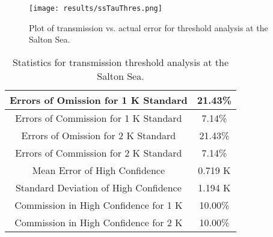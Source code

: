 \documentclass{book}
\begin{document}
\begin{minipage}[c]{0.47\textwidth}
\centering
\begin{figure}[H]
\texttt{[image: results/ssTauThres.png]}
\caption{Plot of transmission vs. actual error for threshold analysis at the Salton Sea.}
\label{fig:ssTauThres}
\end{figure}
\end{minipage}
\hspace{0.0cm}
\begin{minipage}[c]{0.47\textwidth}
\begin{table}[H]
\centering
\footnotesize
\begin{tabular}{ | c | c | } \hline
Errors of Omission for 1 K Standard &  21.43\% \\ \hline
Errors of Commission for 1 K Standard &  7.14\% \\ \hline
Errors of Omission for 2 K Standard & 21.43\% \\ \hline
Errors of Commission for 2 K Standard & 7.14\% \\ \hline
Mean Error of High Confidence &  0.719 K \\ \hline
Standard Deviation of High Confidence &  1.194 K \\ \hline
Commission in High Confidence for 1 K & 10.00\% \\ \hline
Commission in High Confidence for 2 K & 10.00\% \\ \hline
\end{tabular}
\caption{Statistics for transmission threshold analysis at the Salton Sea.}
\label{tab:ssTauThres}
\end{table}
\end{minipage}
\end{document}
